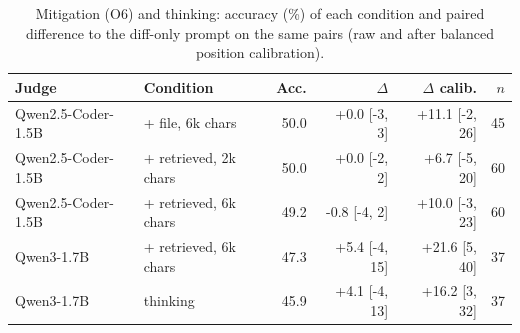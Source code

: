 \begin{table}[t]
\caption{Mitigation (O6) and thinking: accuracy (\%) of each condition and paired difference to the diff-only prompt on the same pairs (raw and after balanced position calibration).}
\label{tab:context}
\centering\footnotesize
\setlength{\tabcolsep}{3pt}
\begin{tabular}{@{}llrrrr@{}}
\toprule
Judge & Condition & Acc. & $\Delta$ & $\Delta$ calib. & $n$ \\
\midrule
Qwen2.5-Coder-1.5B & + file, 6k chars & 50.0 & +0.0 [-3, 3] & +11.1 [-2, 26] & 45 \\
Qwen2.5-Coder-1.5B & + retrieved, 2k chars & 50.0 & +0.0 [-2, 2] & +6.7 [-5, 20] & 60 \\
Qwen2.5-Coder-1.5B & + retrieved, 6k chars & 49.2 & -0.8 [-4, 2] & +10.0 [-3, 23] & 60 \\
Qwen3-1.7B & + retrieved, 6k chars & 47.3 & +5.4 [-4, 15] & +21.6 [5, 40] & 37 \\
Qwen3-1.7B & thinking & 45.9 & +4.1 [-4, 13] & +16.2 [3, 32] & 37 \\
\bottomrule
\end{tabular}
\end{table}
